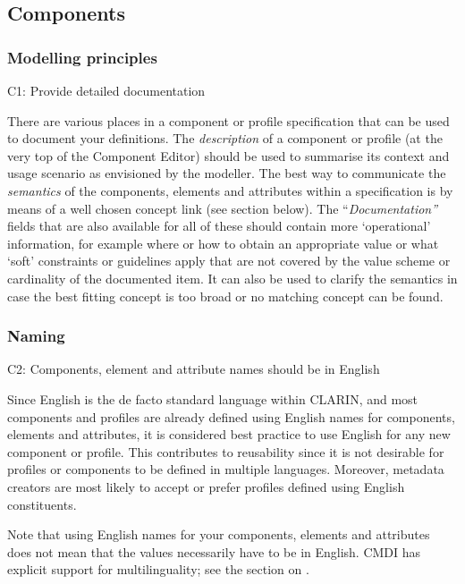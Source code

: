 \subsection{Components}\label{components}
\subsubsection{Modelling principles}\label{modelling-principles}

C1: Provide detailed documentation


There are various places in a component or profile specification that can be used to document your definitions. The \emph{description} of a component or profile (at the very top of the Component Editor) should be used to summarise its context and usage scenario as envisioned by the modeller. The best way to communicate the \emph{semantics} of the components, elements and attributes within a specification is by means of a well chosen concept link (see section  below). The ``\emph{Documentation''} fields that are also available for all of these should contain more `operational' information, for example where or how to obtain an appropriate value or what `soft' constraints or guidelines apply that are not covered by the value scheme or cardinality of the documented item. It can also be used to clarify the
semantics in case the best fitting concept is too broad or no matching concept can be found.

\subsubsection{Naming}\label{naming}

C2: Components, element and attribute names should be in English


Since English is the de facto standard language within CLARIN, and most components and profiles are already defined using English names for components, elements and attributes, it is considered best practice to use English for any new component or profile. This contributes to reusability since it is not desirable for profiles or components to be defined in multiple languages. Moreover, metadata creators are most likely to accept or prefer profiles defined using English constituents.

Note that using English names for your components, elements and attributes does not mean that the values necessarily have to be in English. CMDI has explicit support for multilinguality; see the section on .

